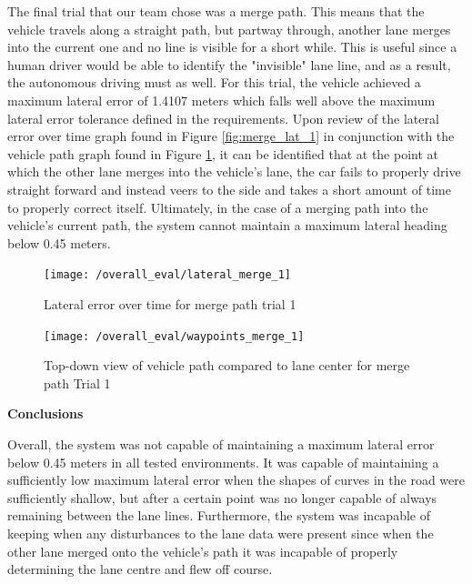 \documentclass[titlepage, draft]{article}
\begin{document}
{The final trial that our team chose was a merge path. This means that the vehicle travels along a straight path, but partway through, another lane merges into the current one and no line is visible for a short while. This is useful since a human driver would be able to identify the "invisible" lane line, and as a result, the autonomous driving must as well. For this trial, the vehicle achieved a maximum lateral error of 1.4107 meters which falls well above the maximum lateral error tolerance defined in the requirements. Upon review of the lateral error over time graph found in Figure \ref{fig:merge_lat_1} in conjunction with the vehicle path graph found in Figure \ref{fig:merge_way_1}, it can be identified that at the point at which the other lane merges into the vehicle's lane, the car fails to properly drive straight forward and instead veers to the side and takes a short amount of time to properly correct itself. Ultimately, in the case of a merging path into the vehicle's current path, the system cannot maintain a maximum lateral heading below 0.45 meters.\\

\begin{figure}
	\centering
	\begin{minipage}{.45\textwidth}
		\centering
		\texttt{[image: /overall\_eval/lateral\_merge\_1]}
		\caption{Lateral error over time for merge path trial 1}
		\label{fig:merge_lat_1}
	\end{minipage}%
	\hspace{0.1\textwidth}%
	\begin{minipage}{.45\textwidth}
		\centering
		\texttt{[image: /overall\_eval/waypoints\_merge\_1]}
		\caption{Top-down view of vehicle path compared to lane center for merge path Trial 1}
		\label{fig:merge_way_1}
	\end{minipage}
\end{figure}

\textbf{Conclusions}

Overall, the system was not capable of maintaining a maximum lateral error below 0.45 meters in all tested environments. It was capable of maintaining a sufficiently low maximum lateral error when the shapes of curves in the road were sufficiently shallow, but after a certain point was no longer capable of always remaining between the lane lines. Furthermore, the system was incapable of keeping when any disturbances to the lane data were present since when the other lane merged onto the vehicle's path it was incapable of properly determining the lane centre and flew off course.

}
\end{document}
